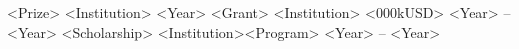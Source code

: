 \begin{cvhonors}
  \cvhonor
	{<Prize>}
	{<Institution>}
	{}
	{<Year>}
  \cvhonor
	{<Grant>}
	{<Institution>}
	{<000kUSD>}
	{<Year> -- <Year>}
  \cvhonor
    {<Scholarship>}
    {<Institution>\enskip\cdotp\enskip <Program>}
    {}
    {<Year> -- <Year>}
\end{cvhonors}